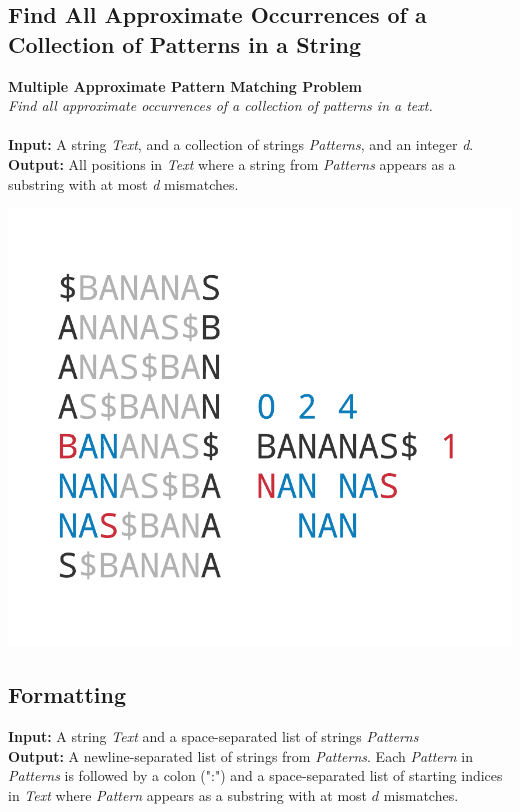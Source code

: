 \documentclass{article}
\begin{document}
\subsection{Find All Approximate Occurrences of a Collection of Patterns in a String}
\hline\vspace{5}
\noindent \textbf{Multiple Approximate Pattern Matching Problem}\\
\emph{Find all approximate occurrences of a collection of patterns in a text.}\\ \\
\textbf{Input:} A string \emph{Text}, and a collection of strings \emph{Patterns}, and an integer \emph{d}. \\
\textbf{Output:} All positions in \emph{Text} where a string from \emph{Patterns} appears as a substring with at most \emph{d} mismatches.
\begin{center}
    \includegraphics[scale=0.2]{logos/9O.png} 
\end{center}
\hline\vspace{5}

\subsection*{Formatting}
\textbf{Input:} A string \emph{Text} and a space-separated list of strings \emph{Patterns}\\
\noindent\textbf{Output:} A newline-separated list of strings from \emph{Patterns}. Each \emph{Pattern} in \emph{Patterns} is followed by a colon (":") and a space-separated list of starting indices in \emph{Text} where \emph{Pattern} appears as a substring with at most $d$ mismatches.
\end{document}
